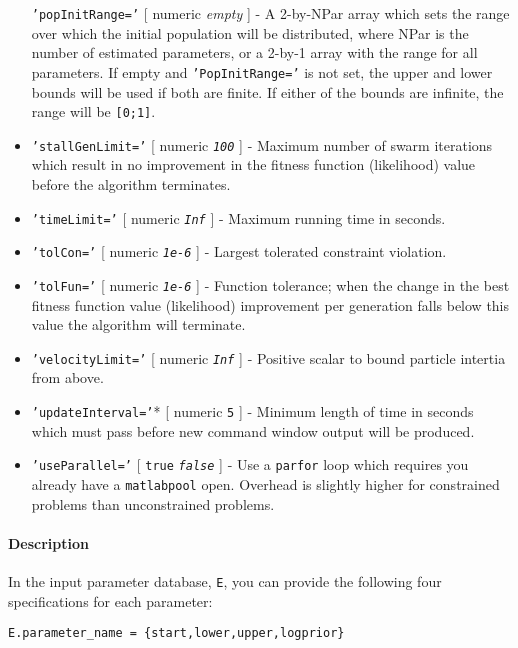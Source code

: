 \begin{itemize}
  \texttt{'popInitRange='} {[} numeric \textbar{} \emph{empty} {]} - A
  2-by-NPar array which sets the range over which the initial population
  will be distributed, where NPar is the number of estimated parameters,
  or a 2-by-1 array with the range for all parameters. If empty and
  \texttt{'PopInitRange='} is not set, the upper and lower bounds will
  be used if both are finite. If either of the bounds are infinite, the
  range will be \texttt{{[}0;1{]}}.
\item
  \texttt{'stallGenLimit='} {[} numeric \textbar{} \emph{\texttt{100}}
  {]} - Maximum number of swarm iterations which result in no
  improvement in the fitness function (likelihood) value before the
  algorithm terminates.
\item
  \texttt{'timeLimit='} {[} numeric \textbar{} \emph{\texttt{Inf}} {]} -
  Maximum running time in seconds.
\item
  \texttt{'tolCon='} {[} numeric \textbar{} \emph{\texttt{1e-6}} {]} -
  Largest tolerated constraint violation.
\item
  \texttt{'tolFun='} {[} numeric \textbar{} \emph{\texttt{1e-6}} {]} -
  Function tolerance; when the change in the best fitness function value
  (likelihood) improvement per generation falls below this value the
  algorithm will terminate.
\item
  \texttt{'velocityLimit='} {[} numeric \textbar{} \emph{\texttt{Inf}}
  {]} - Positive scalar to bound particle intertia from above.
\item
  \texttt{'updateInterval='}* {[} numeric \textbar{} \texttt{5} {]} -
  Minimum length of time in seconds which must pass before new command
  window output will be produced.
\item
  \texttt{'useParallel='} {[} \texttt{true} \textbar{}
  \emph{\texttt{false}} {]} - Use a \texttt{parfor} loop which requires
  you already have a \texttt{matlabpool} open. Overhead is slightly
  higher for constrained problems than unconstrained problems.
\end{itemize}

\paragraph{Description}

In the input parameter database, \texttt{E}, you can provide the
following four specifications for each parameter:

\begin{verbatim}
E.parameter_name = {start,lower,upper,logprior}
\end{verbatim}

